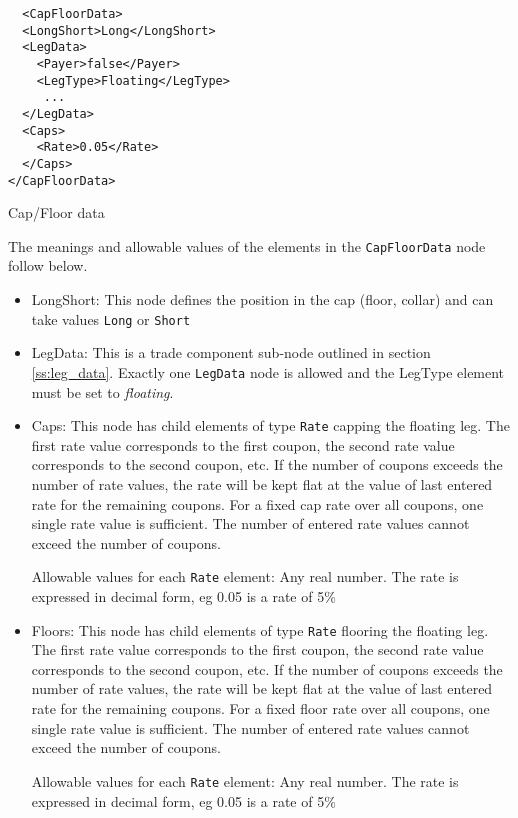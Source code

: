 \begin{listing}[H]
\begin{verbatim}
  <CapFloorData>
  <LongShort>Long</LongShort>
  <LegData>
    <Payer>false</Payer>
    <LegType>Floating</LegType>
     ...
  </LegData>
  <Caps>
    <Rate>0.05</Rate>
  </Caps>
</CapFloorData>
\end{verbatim}
\caption{Cap/Floor data}
\label{lst:capfloor_data}
\end{listing}

The meanings and allowable values of the elements in the \lstinline!CapFloorData!  node follow below.

\begin{itemize}

\item LongShort: This node defines the position in the cap (floor, collar) and can take values \lstinline!Long! or
  \lstinline!Short!

\item LegData: This is a trade component sub-node outlined in section \ref{ss:leg_data}. Exactly
  one \lstinline!LegData! node is allowed and the LegType element must be set to \emph{floating}.

\item Caps: This node has child elements of type \lstinline!Rate!
  capping the floating leg. The first rate value corresponds to the
  first coupon, the second rate value corresponds to the second
  coupon, etc. If the number of coupons exceeds the number of rate
  values, the rate will be kept flat at the value of last entered rate
  for the remaining coupons. For a fixed cap rate over all coupons,
  one single rate value is sufficient. The number of entered rate
  values cannot exceed the number of coupons. 

  Allowable values for each \lstinline!Rate! element: Any real number. The rate is expressed in decimal form, eg 0.05 is
  a rate of 5\%

\item Floors: This node has child elements of type
  \lstinline!Rate! flooring the floating leg.  The first rate value
  corresponds to the first coupon, the second rate value corresponds
  to the second coupon, etc. If the number of coupons exceeds the
  number of rate values, the rate will be kept flat at the value of
  last entered rate for the remaining coupons. For a fixed floor rate
  over all coupons, one single rate value is sufficient. The number of
  entered rate values cannot exceed the number of coupons.

  Allowable values for each \lstinline!Rate! element: Any real number. The rate is expressed in decimal form, eg 0.05 is
  a rate of 5\%

\end{itemize}

